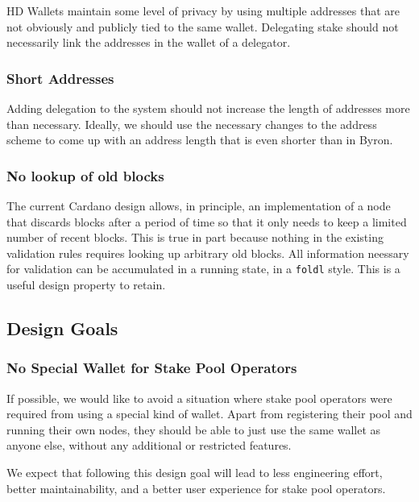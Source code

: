 \documentclass[11pt,a4paper]{article}
\begin{document}
HD Wallets maintain some level of privacy by using multiple addresses
that are not obviously and publicly tied to the same wallet. Delegating
stake should not necessarily link the addresses in the wallet of a
delegator.

\subsubsection{Short Addresses}\label{short-addresses}

Adding delegation to the system should not increase the length of
addresses more than necessary. Ideally, we should use the necessary
changes to the address scheme to come up with an address length that is
even shorter than in Byron.

\subsubsection{No lookup of old blocks}\label{no-lookup-of-old-blocks}

The current Cardano design allows, in principle, an implementation of a
node that discards blocks after a period of time so that it only needs
to keep a limited number of recent blocks. This is true in part because
nothing in the existing validation rules requires looking up arbitrary
old blocks. All information neessary for validation can be accumulated
in a running state, in a \texttt{foldl} style. This is a useful design
property to retain.

\subsection{Design Goals}\label{design-goals}

\subsubsection{No Special Wallet for Stake Pool
Operators}\label{no-special-wallet-for-stake-pool-operators}

If possible, we would like to avoid a situation where stake pool
operators were required from using a special kind of wallet. Apart from
registering their pool and running their own nodes, they should be able
to just use the same wallet as anyone else, without any additional or
restricted features.

We expect that following this design goal will lead to less engineering
effort, better maintainability, and a better user experience for stake
pool operators.
\end{document}
